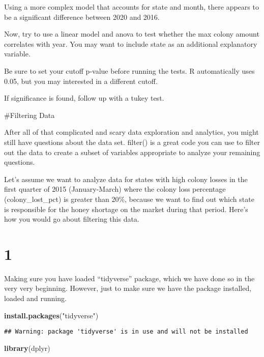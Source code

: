 \documentclass[
]{article}
\newenvironment{Shaded}{\begin{snugshade}}{\end{snugshade}}
\newcommand{\FunctionTok}[1]{\textcolor[rgb]{0.13,0.29,0.53}{\textbf{#1}}}
\newcommand{\NormalTok}[1]{#1}
\newcommand{\StringTok}[1]{\textcolor[rgb]{0.31,0.60,0.02}{#1}}
\begin{document}
Using a more complex model that accounts for state and month, there
appears to be a significant difference between 2020 and 2016.

Now, try to use a linear model and anova to test whether the max colony
amount correlates with year. You may want to include state as an
additional explanatory variable.

Be sure to set your cutoff p-value before running the tests. R
automatically uses 0.05, but you may interested in a different cutoff.

If significance is found, follow up with a tukey test.

\#Filtering Data

After all of that complicated and scary data exploration and analytics,
you might still have questions about the data set. filter() is a great
code you can use to filter out the data to create a subset of variables
appropriate to analyze your remaining questions.

Let's assume we want to analyze data for states with high colony losses
in the first quarter of 2015 (January-March) where the colony loss
percentage (colony\_lost\_pct) is greater than 20\%, because we want to
find out which state is responsible for the honey shortage on the market
during that period. Here's how you would go about filtering this data.

\section{1}\label{section}

Making sure you have loaded ``tidyverse'' package, which we have done so
in the very very beginning. However, just to make sure we have the
package installed, loaded and running.

\begin{Shaded}
\begin{Highlighting}[]
\FunctionTok{install.packages}\NormalTok{(}\StringTok{"tidyverse"}\NormalTok{)}
\end{Highlighting}
\end{Shaded}

\begin{verbatim}
## Warning: package 'tidyverse' is in use and will not be installed
\end{verbatim}

\begin{Shaded}
\begin{Highlighting}[]
\FunctionTok{library}\NormalTok{(dplyr)}
\end{Highlighting}
\end{Shaded}
\end{document}

